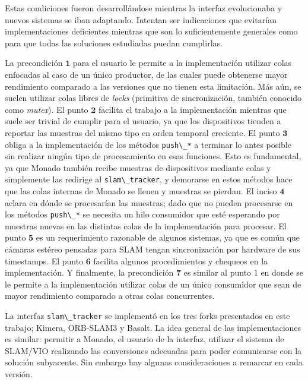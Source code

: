 \documentclass[ twoside,openright,titlepage,numbers=noenddot,%
                headinclude,footinclude,cleardoublepage=empty,abstract=on,
                BCOR=-5mm,paper=a4,fontsize=11pt
                ]{scrreprt}
\newcommand{\passthrough}[1]{#1}
\begin{document}
Estas condiciones fueron desarrollándose mientras la interfaz
evolucionaba y nuevos sistemas se iban adaptando. Intentan ser
indicaciones que evitarían implementaciones deficientes mientras que son
lo suficientemente generales como para que todas las soluciones
estudiadas puedan cumplirlas.

La precondición \(\mathbf{1}\) para el usuario le permite a la
implementación utilizar colas enfocadas al caso de un único productor,
de las cuales puede obtenerse mayor rendimiento comparado a las
versiones que no tienen esta limitación. Más aún, se suelen utilizar
colas libres de \emph{locks} (primitiva de sincronización, también
conocido como \emph{mutex}). El punto \(\mathbf{2}\) facilita el trabajo
a la implementación mientras que suele ser trivial de cumplir para el
usuario, ya que los dispositivos tienden a reportar las muestras del
mismo tipo en orden temporal creciente. El punto \(\mathbf{3}\) obliga a
la implementación de los métodos \passthrough{\lstinline!push\_*!} a
terminar lo antes posible sin realizar ningún tipo de procesamiento en
esas funciones. Esto es fundamental, ya que Monado también recibe
muestras de dispositivos mediante colas y simplemente las redirige al
\passthrough{\lstinline!slam\_tracker!}, y demorarse en estos métodos
hace que las colas internas de Monado se llenen y muestras se pierdan.
El inciso \(\mathbf{4}\) aclara en dónde se procesarían las muestras;
dado que no pueden procesarse en los métodos
\passthrough{\lstinline!push\_*!} se necesita un hilo consumidor que
esté esperando por muestras nuevas en las distintas colas de la
implementación para procesar. El punto \(\mathbf{5}\) es un
requerimiento razonable de algunos sistemas, ya que es común que cámaras
estéreo pensadas para SLAM tengan sincronización por hardware de sus
timestamps. El punto \(\mathbf{6}\) facilita algunos procedimientos y
chequeos en la implementación. Y finalmente, la precondición
\(\mathbf{7}\) es similar al punto 1 en donde se le permite a la
implementación utilizar colas de un único consumidor que sean de mayor
rendimiento comparado a otras colas concurrentes.

La interfaz \passthrough{\lstinline!slam\_tracker!} se implementó en los
tres forks presentados en este trabajo; Kimera, ORB-SLAM3 y Basalt. La
idea general de las implementaciones es similar: permitir a Monado, el
usuario de la interfaz, utilizar el sistema de SLAM/VIO realizando las
conversiones adecuadas para poder comunicarse con la solución
subyacente. Sin embargo hay algunas consideraciones a remarcar en cada
versión.
\end{document}
